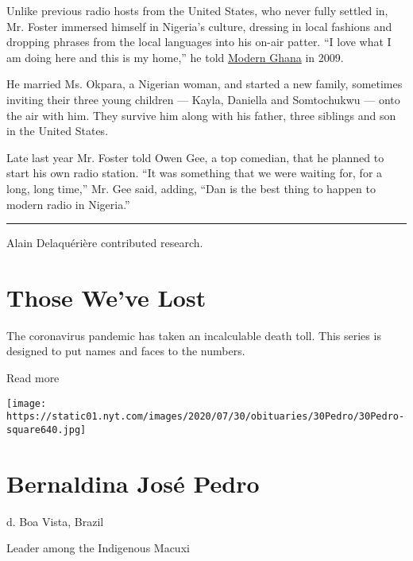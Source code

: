 Unlike previous radio hosts from the United States, who never fully
settled in, Mr. Foster immersed himself in Nigeria's culture, dressing
in local fashions and dropping phrases from the local languages into his
on-air patter. ``I love what I am doing here and this is my home,'' he
told
\href{https://www.modernghana.com/movie/4751/3/i-left-cool-fm-because-i-wanted-to-grow-dan-foster.html}{Modern
Ghana} in 2009.

He married Ms. Okpara, a Nigerian woman, and started a new family,
sometimes inviting their three young children --- Kayla, Daniella and
Somtochukwu --- onto the air with him. They survive him along with his
father, three siblings and son in the United States.

Late last year Mr. Foster told Owen Gee, a top comedian, that he planned
to start his own radio station. ``It was something that we were waiting
for, for a long, long time,'' Mr. Gee said, adding, ``Dan is the best
thing to happen to modern radio in Nigeria.''

\begin{center}\rule{0.5\linewidth}{\linethickness}\end{center}

Alain Delaquérière contributed research.

\href{https://www.nytimes.com/interactive/2020/obituaries/people-died-coronavirus-obituaries.html?action=click\&pgtype=Article\&state=default\&region=BELOW_MAIN_CONTENT\&context=covid_obits_promo}{}

\hypertarget{those-weve-lost}{%
\section{Those We've Lost}\label{those-weve-lost}}

The coronavirus pandemic has taken an incalculable death toll. This
series is designed to put names and faces to the numbers.

Read more

\texttt{[image: https://static01.nyt.com/images/2020/07/30/obituaries/30Pedro/30Pedro-square640.jpg]}

\hypertarget{bernaldina-josuxe9-pedro}{%
\section{Bernaldina José Pedro}\label{bernaldina-josuxe9-pedro}}

d. Boa Vista, Brazil

Leader among the Indigenous Macuxi

